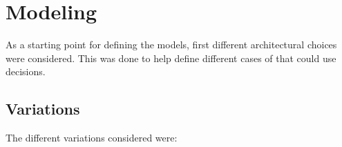 











\section{Modeling}


As a starting point for defining the models, first different architectural choices were considered. This was done to help define different cases of \wsn that could use decisions. 

\subsection{Variations}

The different variations considered were: \\


